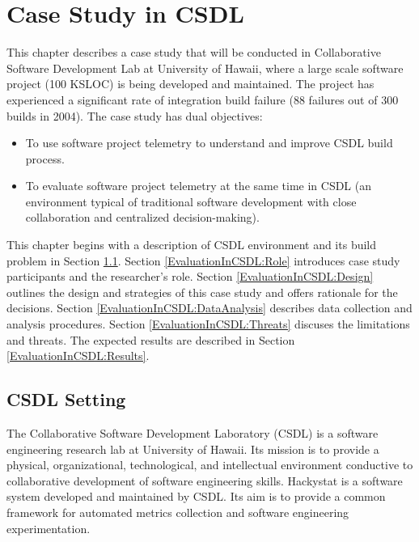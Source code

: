 \chapter{Case Study in CSDL} \label{Chapter:EvaluationInCSDL}


This chapter describes a case study that will be conducted in Collaborative Software Development Lab at University of Hawaii, where a large scale software project (100 KSLOC) is being developed and maintained. The project has experienced a significant rate of integration build failure (88 failures out of 300 builds in 2004). The case study has dual objectives: 

\begin{itemize}
	\item To use software project telemetry to understand and improve CSDL build process.
	\item To evaluate software project telemetry at the same time in CSDL (an environment typical of traditional software development with close collaboration and centralized decision-making). 
\end{itemize}



This chapter begins with a description of CSDL environment and its build problem in Section \ref{EvaluationInCSDL:Setting}.
Section \ref{EvaluationInCSDL:Role} introduces case study participants and the researcher's role.
Section \ref{EvaluationInCSDL:Design} outlines the design and strategies of this case study and offers rationale for the decisions.
Section \ref{EvaluationInCSDL:DataAnalysis} describes data collection and analysis procedures.
Section \ref{EvaluationInCSDL:Threats} discuses the limitations and threats. 
The expected results are described in Section \ref{EvaluationInCSDL:Results}.
 
 


\section{CSDL Setting}  \label{EvaluationInCSDL:Setting}

The Collaborative Software Development Laboratory (CSDL) is a software engineering research lab at University of Hawaii. Its mission is to provide a physical, organizational, technological, and intellectual environment conductive to collaborative development of software engineering skills. Hackystat is a software system developed and maintained by CSDL. Its aim is to provide a common framework for automated metrics collection and software engineering experimentation. %




